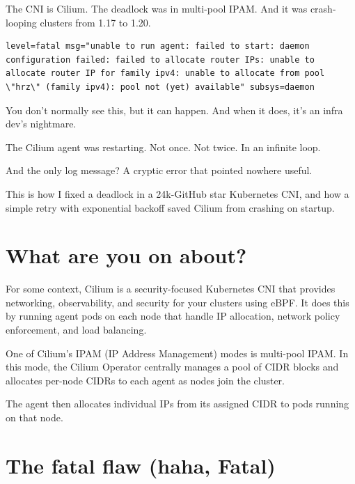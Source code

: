 

\newcommand{\DocTitle}{Fixing a deadlock in a 24k-star Kubernetes CNI. Here's how I did it.}
\newcommand{\DocDescription}{what a lovely way to spend the weekend}
\newcommand{\DocTags}{writeup, Go, Kubernetes, Open Source, Networks}




The CNI is Cilium. The deadlock was in multi-pool IPAM. And it was crash-looping clusters from 1.17 to 1.20.

\begin{verbatim}
level=fatal msg="unable to run agent: failed to start: daemon configuration failed: failed to allocate router IPs: unable to allocate router IP for family ipv4: unable to allocate from pool \"hrz\" (family ipv4): pool not (yet) available" subsys=daemon
\end{verbatim}

You don't normally see this, but it can happen. And when it does, it's an infra dev's nightmare.

The Cilium agent was restarting. Not once. Not twice. In an infinite loop.

And the only log message? A cryptic error that pointed nowhere useful.

This is how I fixed a deadlock in a 24k-GitHub star Kubernetes CNI, and how a simple retry with exponential backoff saved Cilium from crashing on startup.

\section{What are you on about?}

For some context, Cilium is a security-focused Kubernetes CNI that provides networking, observability, and security for your clusters using eBPF. It does this by running agent pods on each node that handle IP allocation, network policy enforcement, and load balancing.

One of Cilium's IPAM (IP Address Management) modes is multi-pool IPAM. In this mode, the Cilium Operator centrally manages a pool of CIDR blocks and allocates per-node CIDRs to each agent as nodes join the cluster.

The agent then allocates individual IPs from its assigned CIDR to pods running on that node.

\section{The fatal flaw (haha, Fatal)}

